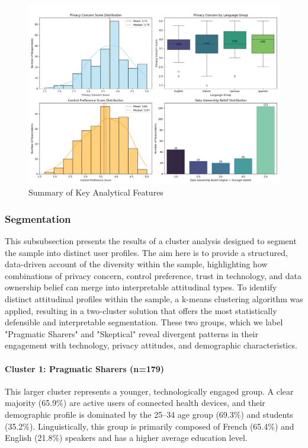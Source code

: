 	\begin{figure}[h!]
        \centering %
		\includegraphics[width=\linewidth]{figures/img/derived_features_summary.png}
		\caption{Summary of Key Analytical Features}
		\label{fig:derived_features_summary}
	\end{figure}
	\subsubsection{Segmentation}
This subsubsection presents the results of a cluster analysis designed to segment the sample into distinct user profiles. The aim here is to provide a structured, data-driven account of the diversity within the sample, highlighting how combinations of privacy concern, control preference, trust in technology, and data ownership belief can merge into interpretable attitudinal types.
To identify distinct attitudinal profiles within the sample, a k-means clustering algorithm was applied, resulting in a two-cluster solution that offers the most statistically defensible and interpretable segmentation. These two groups, which we label "Pragmatic Sharers" and "Skeptical" reveal divergent patterns in their engagement with technology, privacy attitudes, and demographic characteristics.

\paragraph{Cluster 1: Pragmatic Sharers (n=179)} This larger cluster represents a younger, technologically engaged group. A clear majority (65.9\%) are active users of connected health devices, and their demographic profile is dominated by the 25--34 age group (69.3\%) and students (35.2\%). Linguistically, this group is primarily composed of French (65.4\%) and English (21.8\%) speakers and has a higher average education level.

